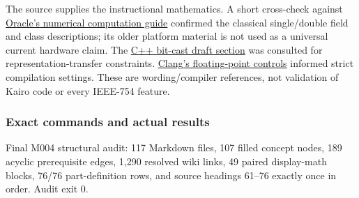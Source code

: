 \hypertarget{appendix-a103e7846d21-independent-wording-references}{}

The source supplies the instructional mathematics. A short cross-check against \href{https://docs.oracle.com/cd/E19957-01/806-3568/ncg_math.html}{Oracle's numerical computation guide} confirmed the classical single/double field and class descriptions; its older platform material is not used as a universal current hardware claim. The \href{https://eel.is/c++draft/bit.cast}{C++ bit-cast draft section} was consulted for representation-transfer constraints. \href{https://clang.llvm.org/docs/UsersManual.html\#controlling-floating-point-behavior}{Clang's floating-point controls} informed strict compilation settings. These are wording/compiler references, not validation of Kairo code or every IEEE-754 feature.

\subsubsection{Exact commands and actual results}\label{appendix-a103e7846d21-exact-commands-and-actual-results}

\hypertarget{appendix-a103e7846d21-exact-commands-and-actual-results}{}

Final M004 structural audit: 117 Markdown files, 107 filled concept nodes, 189 acyclic prerequisite edges, 1,290 resolved wiki links, 49 paired display-math blocks, 76/76 part-definition rows, and source headings 61--76 exactly once in order. Audit exit 0.

